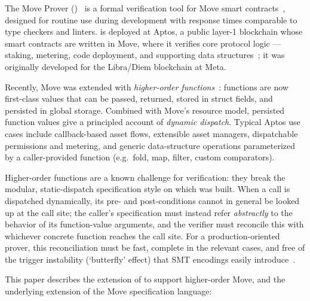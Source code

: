 \label{sec:intro}

The Move Prover (\MVP)~\cite{DillGPQXZ22} is a formal verification tool for Move smart contracts~\cite{blackshear2020resources,MoveOnAptosBook}, designed for routine use during development with response times comparable to type checkers and linters.
\MVP is deployed at Aptos, a public layer-1 blockchain whose smart contracts are written in Move, where it verifies core protocol logic --- staking, metering, code deployment, and supporting data structures~\cite{ParkZGXGCLC24, TopoFrameworkBook}; it was originally developed for the Libra/Diem blockchain at Meta.

Recently, Move was extended with \emph{higher-order functions}~\cite{grieskamp2025movehigherorder}: functions are now first-class values that can be passed, returned, stored in struct fields, and persisted in global storage.
Combined with Move's resource model, persisted function values give a principled account of \emph{dynamic dispatch}.
Typical Aptos use cases include callback-based asset flows, extensible asset managers, dispatchable permissions and metering, and generic data-structure operations parameterized by a caller-provided function (e.g.\ fold, map, filter, custom comparators).

Higher-order functions are a known challenge for verification: they break the modular, static-dispatch specification style on which \MVP was built.
When a call is dispatched dynamically, its pre- and post-conditions cannot in general be looked up at the call site; the caller's specification must instead refer \emph{abstractly} to the behavior of its function-value arguments, and the verifier must reconcile this with whichever concrete function reaches the call site.
For a production-oriented prover, this reconciliation must be fast, complete in the relevant cases, and free of the trigger instability (`butterfly' effect) that SMT encodings easily introduce~\cite{BUTTERFLY}.

This paper describes the extension of \MVP to support higher-order Move, and the underlying extension of the Move specification language:

